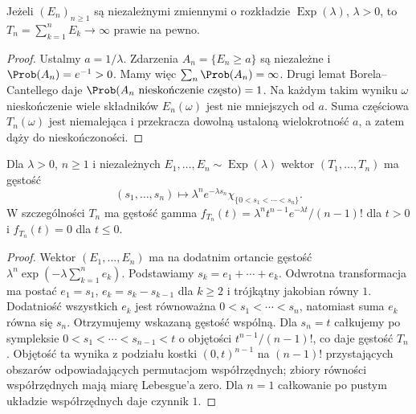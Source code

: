 \begin{lemat}
Jeżeli $(E_n)_{n\ge1}$ są niezależnymi zmiennymi o rozkładzie
$\operatorname{Exp}(\lambda)$, $\lambda>0$, to
$T_n=\sum_{k=1}^n E_k\to\infty$ prawie na pewno.
\end{lemat}
\begin{proof}
Ustalmy $a=1/\lambda$. Zdarzenia $A_n=\{E_n\ge a\}$ są niezależne
i $\Prob(A_n)=e^{-1}>0$. Mamy więc
$\sum_n\Prob(A_n)=\infty$. Drugi lemat Borela--Cantellego daje
$\Prob(A_n\ \text{nieskończenie często})=1$. Na każdym takim
wyniku $\omega$ nieskończenie wiele składników $E_n(\omega)$ jest
nie mniejszych od $a$. Suma częściowa $T_n(\omega)$ jest niemalejąca
i przekracza dowolną ustaloną wielokrotność $a$, a zatem dąży do
nieskończoności.
\end{proof}

\begin{lemat}
Dla $\lambda>0$, $n\ge1$ i niezależnych
$E_1,\ldots,E_n\sim\operatorname{Exp}(\lambda)$ wektor
$(T_1,\ldots,T_n)$ ma gęstość
\[
(s_1,\ldots,s_n)\longmapsto
\lambda^n e^{-\lambda s_n}\chi_{\{0<s_1<\cdots<s_n\}}.
\]
W szczególności $T_n$ ma gęstość gamma
$f_{T_n}(t)=\lambda^n t^{n-1}e^{-\lambda t}/(n-1)!$ dla $t>0$
i $f_{T_n}(t)=0$ dla $t\le0$.
\end{lemat}
\begin{proof}
Wektor $(E_1,\ldots,E_n)$ ma na dodatnim ortancie gęstość
$\lambda^n\exp(-\lambda\sum_{k=1}^n e_k)$.
Podstawiamy $s_k=e_1+\cdots+e_k$. Odwrotna transformacja ma postać
$e_1=s_1$, $e_k=s_k-s_{k-1}$ dla $k\ge2$ i trójkątny jakobian
równy $1$. Dodatniość wszystkich $e_k$ jest równoważna
$0<s_1<\cdots<s_n$, natomiast suma $e_k$ równa się $s_n$.
Otrzymujemy wskazaną gęstość wspólną. Dla $s_n=t$ całkujemy po
sympleksie $0<s_1<\cdots<s_{n-1}<t$ o objętości
$t^{n-1}/(n-1)!$, co daje gęstość $T_n$.
Objętość ta wynika z podziału kostki $(0,t)^{n-1}$
na $(n-1)!$ przystających obszarów odpowiadających
permutacjom współrzędnych; zbiory równości współrzędnych
mają miarę Lebesgue'a zero. Dla $n=1$ całkowanie
po pustym układzie współrzędnych daje czynnik $1$.
\end{proof}

